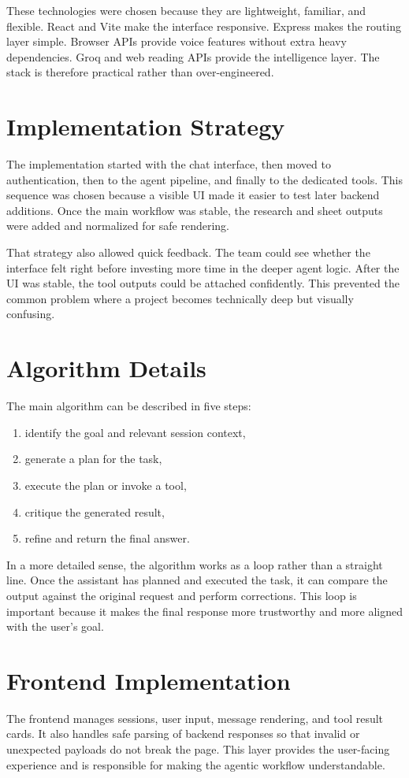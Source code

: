 \documentclass[11pt,oneside]{report}
\begin{document}
These technologies were chosen because they are lightweight, familiar, and flexible. React and Vite make the interface responsive. Express makes the routing layer simple. Browser APIs provide voice features without extra heavy dependencies. Groq and web reading APIs provide the intelligence layer. The stack is therefore practical rather than over-engineered.

\section{Implementation Strategy}
The implementation started with the chat interface, then moved to authentication, then to the agent pipeline, and finally to the dedicated tools. This sequence was chosen because a visible UI made it easier to test later backend additions. Once the main workflow was stable, the research and sheet outputs were added and normalized for safe rendering.

That strategy also allowed quick feedback. The team could see whether the interface felt right before investing more time in the deeper agent logic. After the UI was stable, the tool outputs could be attached confidently. This prevented the common problem where a project becomes technically deep but visually confusing.

\section{Algorithm Details}
The main algorithm can be described in five steps:
\begin{enumerate}[leftmargin=1.2cm]
  \item identify the goal and relevant session context,
  \item generate a plan for the task,
  \item execute the plan or invoke a tool,
  \item critique the generated result,
  \item refine and return the final answer.
\end{enumerate}

In a more detailed sense, the algorithm works as a loop rather than a straight line. Once the assistant has planned and executed the task, it can compare the output against the original request and perform corrections. This loop is important because it makes the final response more trustworthy and more aligned with the user’s goal.

\section{Frontend Implementation}
The frontend manages sessions, user input, message rendering, and tool result cards. It also handles safe parsing of backend responses so that invalid or unexpected payloads do not break the page. This layer provides the user-facing experience and is responsible for making the agentic workflow understandable.
\end{document}

